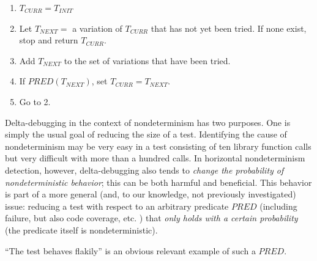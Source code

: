\begin{enumerate}
\item $T_{\mathit{CURR}} = T_{\mathit{INIT}}$
\item Let $T_{\mathit{NEXT}} =$ a variation of $T_{\mathit{CURR}}$
  that has not yet been tried.  If none exist, stop and return $T_{\mathit{CURR}}$.
\item Add $T_{\mathit{NEXT}}$ to the set of variations that have been
  tried.
\item If $\mathit{PRED}(T_{\mathit{NEXT}})$, set $T_{\mathit{CURR}} =
  T_{\mathit{NEXT}}$.
\item Go to 2.
\end{enumerate}

Delta-debugging in the context of nondeterminism has two
purposes.  One is simply the usual goal of reducing the size of a
test.  Identifying the cause of nondeterminism may be very easy in a
test consisting of ten library function calls but very difficult with
more than a hundred calls.  In horizontal nondeterminism detection, however,
delta-debugging also tends to \emph{change the probability of
  nondeterministic behavior}; this can be both harmful and
beneficial.  This behavior is part of a more general (and, to our
knowledge, not previously investigated) issue: reducing a test with
respect to an arbitrary predicate $\mathit{PRED}$ (including failure,
but also code coverage, etc. \cite{icst2014,stvrcausereduce}) that \emph{only holds with a
certain probability} (the predicate itself is nondeterministic).

``The test behaves flakily'' is an obvious relevant example of such a $\mathit{PRED}$.


